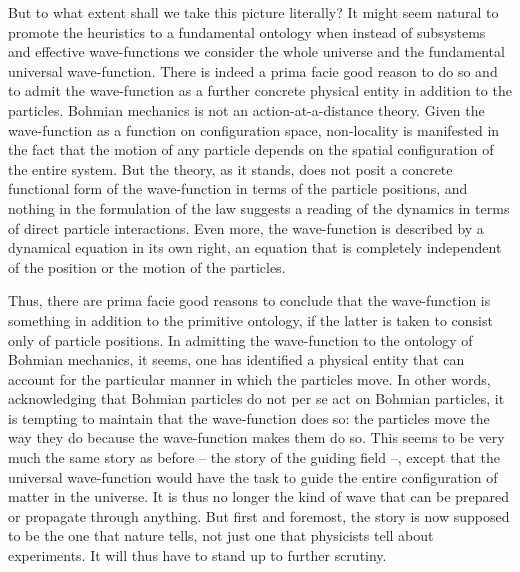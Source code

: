 \documentclass[12pt]{article}
\theoremstyle{definition}
\begin{document}
But to what extent shall we take this picture literally? It might seem natural to promote the heuristics to a fundamental ontology when instead of subsystems and effective wave-functions we consider the whole universe and the fundamental universal wave-function. There is indeed a prima facie good reason to do so and to admit the wave-function as a further concrete physical entity in addition to the particles. Bohmian mechanics is not an action-at-a-distance theory. Given the wave-function as a function on configuration space, non-locality is manifested in the fact that the motion of any particle depends on the spatial configuration of the entire system. But the theory, as it stands, does not posit a concrete functional form of the wave-function in terms of the particle positions, and nothing in the formulation of the law suggests a reading of the dynamics in terms of direct particle interactions. Even more, the wave-function is described by a dynamical equation in its own right, an equation that is completely independent of the position or the motion of the particles.

Thus, there are prima facie good reasons to conclude that the wave-function is something in addition to the primitive ontology, if the latter is taken to consist only of particle positions. In admitting the wave-function to the ontology of Bohmian mechanics, it seems, one has identified a physical entity that can account for the particular manner in which the particles move. In other words, acknowledging that Bohmian particles do not per se act on Bohmian particles, it is tempting to maintain that the wave-function does so: the particles move the way they do because the wave-function makes them do so. This seems to be very much the same story as before -- the story of the guiding field --, except that the universal wave-function would have the task to guide the entire configuration of matter in the universe. It is thus no longer the kind of wave that can be prepared or propagate through anything. But first and foremost, the story is now supposed to be the one that nature tells, not just one that physicists tell about experiments. It will thus have to stand up to further scrutiny.
\end{document}
